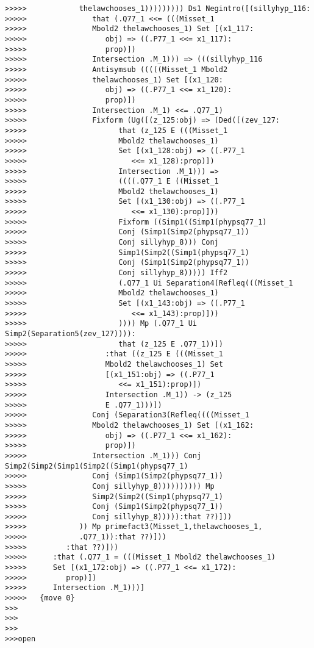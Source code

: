 \documentclass[12pt]{article}
\begin{document}
\begin{verbatim}
>>>>>            thelawchooses_1))))))))) Ds1 Negintro([(sillyhyp_116:
>>>>>               that (.Q77_1 <<= (((Misset_1
>>>>>               Mbold2 thelawchooses_1) Set [(x1_117:
>>>>>                  obj) => ((.P77_1 <<= x1_117):
>>>>>                  prop)])
>>>>>               Intersection .M_1))) => (((sillyhyp_116
>>>>>               Antisymsub (((((Misset_1 Mbold2
>>>>>               thelawchooses_1) Set [(x1_120:
>>>>>                  obj) => ((.P77_1 <<= x1_120):
>>>>>                  prop)])
>>>>>               Intersection .M_1) <<= .Q77_1)
>>>>>               Fixform (Ug([(z_125:obj) => (Ded([(zev_127:
>>>>>                     that (z_125 E (((Misset_1
>>>>>                     Mbold2 thelawchooses_1)
>>>>>                     Set [(x1_128:obj) => ((.P77_1
>>>>>                        <<= x1_128):prop)])
>>>>>                     Intersection .M_1))) =>
>>>>>                     ((((.Q77_1 E ((Misset_1
>>>>>                     Mbold2 thelawchooses_1)
>>>>>                     Set [(x1_130:obj) => ((.P77_1
>>>>>                        <<= x1_130):prop)]))
>>>>>                     Fixform ((Simp1((Simp1(phypsq77_1)
>>>>>                     Conj (Simp1(Simp2(phypsq77_1))
>>>>>                     Conj sillyhyp_8))) Conj
>>>>>                     Simp1(Simp2((Simp1(phypsq77_1)
>>>>>                     Conj (Simp1(Simp2(phypsq77_1))
>>>>>                     Conj sillyhyp_8))))) Iff2
>>>>>                     (.Q77_1 Ui Separation4(Refleq(((Misset_1
>>>>>                     Mbold2 thelawchooses_1)
>>>>>                     Set [(x1_143:obj) => ((.P77_1
>>>>>                        <<= x1_143):prop)]))
>>>>>                     )))) Mp (.Q77_1 Ui Simp2(Separation5(zev_127)))):
>>>>>                     that (z_125 E .Q77_1))])
>>>>>                  :that ((z_125 E (((Misset_1
>>>>>                  Mbold2 thelawchooses_1) Set
>>>>>                  [(x1_151:obj) => ((.P77_1
>>>>>                     <<= x1_151):prop)])
>>>>>                  Intersection .M_1)) -> (z_125
>>>>>                  E .Q77_1)))])
>>>>>               Conj (Separation3(Refleq((((Misset_1
>>>>>               Mbold2 thelawchooses_1) Set [(x1_162:
>>>>>                  obj) => ((.P77_1 <<= x1_162):
>>>>>                  prop)])
>>>>>               Intersection .M_1))) Conj Simp2(Simp2(Simp1(Simp2((Simp1(phypsq77_1)
>>>>>               Conj (Simp1(Simp2(phypsq77_1))
>>>>>               Conj sillyhyp_8)))))))))) Mp
>>>>>               Simp2(Simp2((Simp1(phypsq77_1)
>>>>>               Conj (Simp1(Simp2(phypsq77_1))
>>>>>               Conj sillyhyp_8))))):that ??)]))
>>>>>            )) Mp primefact3(Misset_1,thelawchooses_1,
>>>>>            .Q77_1)):that ??)]))
>>>>>         :that ??)]))
>>>>>      :that (.Q77_1 = (((Misset_1 Mbold2 thelawchooses_1)
>>>>>      Set [(x1_172:obj) => ((.P77_1 <<= x1_172):
>>>>>         prop)])
>>>>>      Intersection .M_1)))]
>>>>>   {move 0}
>>>
>>>
>>>
>>>open


\end{verbatim}
\end{document}
